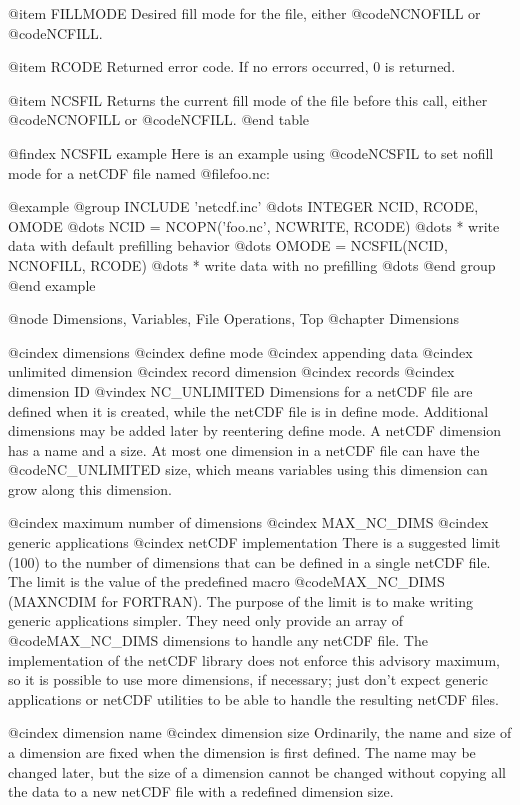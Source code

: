 @item FILLMODE
Desired fill mode for the file, either @code{NCNOFILL} or
@code{NCFILL}.

@item RCODE
Returned error code.  If no errors occurred, 0 is returned.

@item NCSFIL
Returns the current fill mode of the file before this call, either
@code{NCNOFILL} or @code{NCFILL}.
@end table

@findex NCSFIL example
Here is an example using @code{NCSFIL} to set nofill mode for
a netCDF file named @file{foo.nc}:

@example
@group
      INCLUDE 'netcdf.inc'
         @dots{}
      INTEGER NCID, RCODE, OMODE
         @dots{}
      NCID = NCOPN('foo.nc', NCWRITE, RCODE)
         @dots{}
* write data with default prefilling behavior
         @dots{}
      OMODE = NCSFIL(NCID, NCNOFILL, RCODE)
         @dots{}
* write data with no prefilling
         @dots{}
@end group
@end example


@node Dimensions, Variables, File Operations, Top
@chapter Dimensions

@cindex dimensions
@cindex define mode
@cindex appending data
@cindex unlimited dimension
@cindex record dimension
@cindex records
@cindex dimension ID
@vindex NC_UNLIMITED
Dimensions for a netCDF file are defined when it is created, while the
netCDF file is in define mode.  Additional dimensions may be added
later by reentering define mode.  A netCDF dimension has a name and a
size.  At most one dimension in a netCDF file can
have the @code{NC_UNLIMITED} size, which means variables using this
dimension can grow along this dimension.

@cindex maximum number of dimensions
@cindex MAX_NC_DIMS
@cindex generic applications
@cindex netCDF implementation
There is a suggested limit (100) to the number of dimensions
that can be defined in a single netCDF file.  The limit is the value of
the predefined macro @code{MAX_NC_DIMS} (MAXNCDIM for FORTRAN).  The
purpose of the limit is to make writing generic applications simpler.
They need only provide an array of
@code{MAX_NC_DIMS} dimensions to handle any netCDF file.  The
implementation of the netCDF library does not enforce this advisory
maximum, so it is possible to use more dimensions, if necessary; just
don't expect generic applications or netCDF utilities to be able to
handle the resulting netCDF files.

@cindex dimension name
@cindex dimension size
Ordinarily, the name and size of a dimension are fixed when the
dimension is first defined.  The name may be changed later, but the size
of a dimension cannot be changed without copying all the data to a new
netCDF file with a redefined dimension size.

